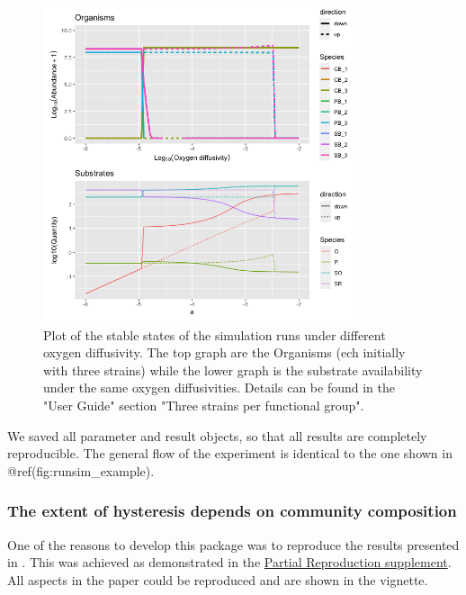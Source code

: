\documentclass[]{elsarticle} %
\begin{document}
\begin{figure}

{\centering \includegraphics[width=350px]{figures/ug_three_strains_stable_state} 

}

\caption{Plot of the stable states of the simulation runs under different oxygen diffusivity. The top graph are the Organisms (ech initially with three strains) while the lower graph is the substrate availability under the same oxygen diffusivities. Details can be found in the "User Guide" section "Three strains per functional group".}\label{fig:uc1_stable_state}
\end{figure}

We saved all parameter and result objects, so that all results are
completely reproducible. The general flow of the experiment is identical
to the one shown in @ref(fig:runsim\_example).

\hypertarget{the-extent-of-hysteresis-depends-on-community-composition}{%
\subsubsection{The extent of hysteresis depends on community
composition}\label{the-extent-of-hysteresis-depends-on-community-composition}}

One of the reasons to develop this package was to reproduce the results
presented in \citet{Bush2017}. This was achieved as demonstrated in the
\href{LINK_NEEDED}{Partial Reproduction supplement}. All aspects in the
paper could be reproduced and are shown in the vignette.
\end{document}
